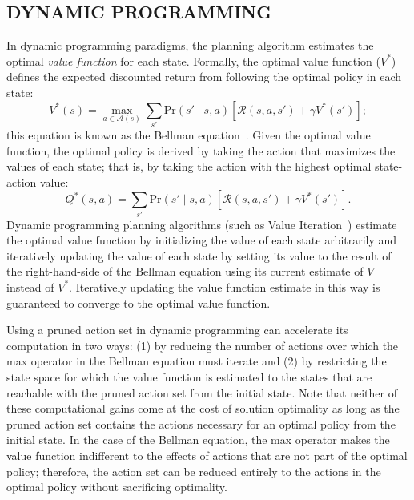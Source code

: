 \documentclass[]{article}
\newcommand{\stnote}[1]{\textcolor{Blue}{\textbf{ST: #1}}}
\newcommand{\dnote}[1]{\textcolor{Orange}{\textbf{D: #1}}}
\begin{document}
\subsection{DYNAMIC PROGRAMMING}
In dynamic programming paradigms, the planning algorithm estimates the
optimal {\em value function} for each state. Formally, the optimal
value function ($V^*$) defines the expected discounted return from
following the optimal policy in each state:
\begin{equation}
\label{eq:bellman}
V^*(s) = \max_{a \in \mathcal{A}(s)} \sum_{s'} \text{Pr}(s' \mid s, a)\left[\mathcal{R}(s,a,s') + \gamma V^*(s') \right];
\end{equation}
this equation is known as the Bellman
equation~\citep{bellman57}. Given the optimal value function, the
optimal policy is derived by taking the action that maximizes the
values of each state; that is, by taking the action with the
highest optimal state-action value:
\begin{equation}
\label{eq:qvalue}
Q^*(s,a) = \sum_{s'} \text{Pr}(s' \mid s, a)\left[\mathcal{R}(s,a,s') + \gamma V^*(s') \right].
\end{equation}
Dynamic programming planning algorithms (such as Value
Iteration~\citep{bellman57}) estimate the optimal value function by
initializing the value of each state arbitrarily and iteratively
updating the value of each state by setting its value to the result of
the right-hand-side of the Bellman equation using its current estimate
of $V$ instead of $V^*$. Iteratively updating the value function
estimate in this way is guaranteed to converge to the optimal value
function.

Using a pruned action set in dynamic programming can accelerate its
computation in two ways: (1) by reducing the number of actions over
which the max operator in the Bellman equation must iterate and (2) by
restricting the state space for which the value function is estimated
to the states that are reachable with the pruned action set from the
initial state. Note that neither of these computational gains come at
the cost of solution optimality as long as the pruned action set
contains the actions necessary for an optimal policy from the initial
state. In the case of the Bellman equation, the max operator makes the
value function indifferent to the effects of actions that are not part
of the optimal policy; therefore, the action set can be reduced
entirely to the actions in the optimal policy without sacrificing
optimality.
\end{document}
